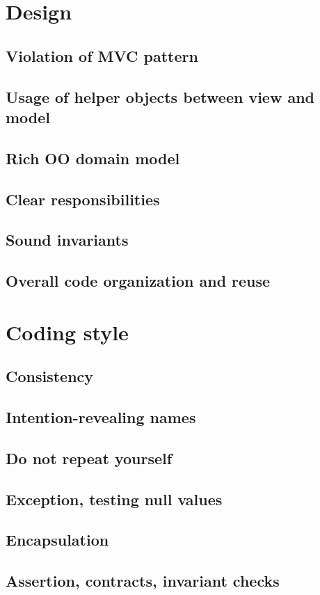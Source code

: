 \documentclass[a4wide]{article}
\title{}
\author{}
\begin{document}

\tableofcontents
\clearpage
\section{Design}
\subsection{Violation of MVC pattern}
\subsection{Usage of helper objects between view and model}
\subsection{Rich OO domain model}
\subsection{Clear responsibilities}
\subsection{Sound invariants}
\subsection{Overall code organization and reuse}
\section{Coding style}
\subsection{Consistency}
\subsection{Intention-revealing names}
\subsection{Do not repeat yourself}
\subsection{Exception, testing null values}
\subsection{Encapsulation}
\subsection{Assertion, contracts, invariant checks}
\end{document}

